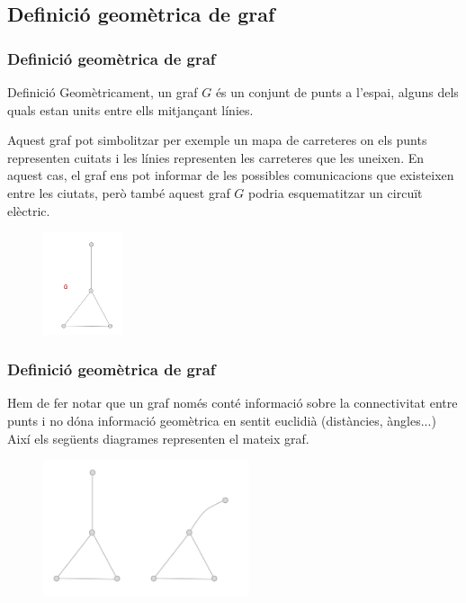 \documentclass{beamer}
\begin{document}
\subsection{Definició geomètrica de graf}
\begin{frame}
\frametitle{Definició geomètrica de graf}
\begin{block}{Definició}
Geomètricament, un graf $G$ és un conjunt de punts a l'espai, alguns dels quals estan units entre ells mitjançant línies. 
\end{block}
Aquest graf pot simbolitzar per exemple un mapa de carreteres on els punts representen cuitats i les línies representen les carreteres que les uneixen. En aquest cas, el graf ens pot informar de les possibles comunicacions que existeixen entre les ciutats, però també aquest graf $G$ podria esquematitzar un circuït elèctric. 

\begin{figure}[h]
 \label{fig:volum}
\centering
\includegraphics[height=3cm]{g1}
\end{figure}\end{frame}





\begin{frame}
\frametitle{Definició geomètrica de graf}

Hem de fer notar que un graf només conté informació sobre la connectivitat entre punts i no dóna informació geomètrica en sentit euclidià (distàncies, àngles...) Així els següents diagrames representen el mateix graf. 


\begin{figure}[h]
 \label{fig:volum}
\centering
\includegraphics[height=4cm]{g2}
\end{figure}
\end{frame}
\end{document}
